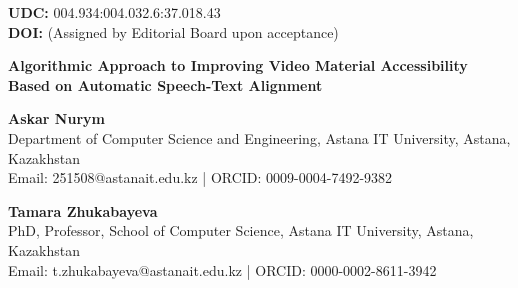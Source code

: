 \documentclass[12pt,a4paper]{article}
\begin{document}
\begin{flushleft}
\textbf{UDC:} 004.934:004.032.6:37.018.43 \\
\textbf{DOI:} (Assigned by Editorial Board upon acceptance)
\end{flushleft}

\vspace{0.5cm}

\begin{center}
    {\large \textbf{Algorithmic Approach to Improving Video Material Accessibility Based on Automatic Speech-Text Alignment}} \par
    \vspace{0.4cm}
    \textbf{Askar Nurym} \\
    Department of Computer Science and Engineering, Astana IT University, Astana, Kazakhstan \\
    Email: 251508@astanait.edu.kz \quad | \quad ORCID: 0009-0004-7492-9382 \par
    \vspace{0.2cm}
    \textbf{Tamara Zhukabayeva} \\
    PhD, Professor, School of Computer Science, Astana IT University, Astana, Kazakhstan \\
    Email: t.zhukabayeva@astanait.edu.kz \quad | \quad ORCID: 0000-0002-8611-3942
\end{center}

\vspace{0.4cm}
\end{document}
